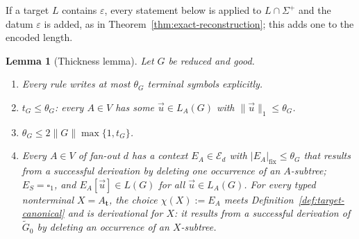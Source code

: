 \documentclass[11pt]{article}
\numberwithin{equation}{section}
\theoremstyle{plain}
\newtheorem{lemma}[theorem]{Lemma}
\theoremstyle{definition}
\theoremstyle{remark}
\newcommand{\tuple}[1]{\vec{#1}}
\newcommand{\blank}{\square}
\newcommand{\eps}{\varepsilon}
\begin{document}
If a target $L$ contains $\eps$, every statement below is applied to
$L\cap\Sigma^+$ and the datum $\eps$ is added, as in
Theorem~\ref{thm:exact-reconstruction}; this adds one to the encoded length.

\begin{lemma}[Thickness lemma]
\label{lem:thickness-equivalence}
\label{lem:thickness-local-bounds}
\label{lem:untyped-contexts}
Let $G$ be reduced and good.
\begin{enumerate}[label=\textup{(\roman*)},leftmargin=*]
\item Every rule writes at most $\theta_G$ terminal symbols explicitly.
\item $t_G\le\theta_G$: every $A\in V$ has some $\tuple u\in L_A(G)$ with
$\|\tuple u\|_1\le\theta_G$.
\item $\theta_G\le 2\|G\|\max\{1,t_G\}$.
\item Every $A\in V$ of fan-out $d$ has a context $E_A\in\mathcal E_d$ with
$|E_A|_{\mathrm{fix}}\le\theta_G$ that results from a successful derivation by
deleting one occurrence of an $A$-subtree; $E_S=\blank_1$, and
$E_A[\tuple u]\in L(G)$ for all $\tuple u\in L_A(G)$.  For every typed nonterminal
$X=A_{\mathbf t}$, the choice $\chi(X):=E_A$ meets
Definition~\ref{def:target-canonical} and is \emph{derivational} for $X$: it
results from a successful derivation of $\widetilde G_0$ by deleting an
occurrence of an $X$-subtree.
\end{enumerate}
\end{lemma}
\end{document}
